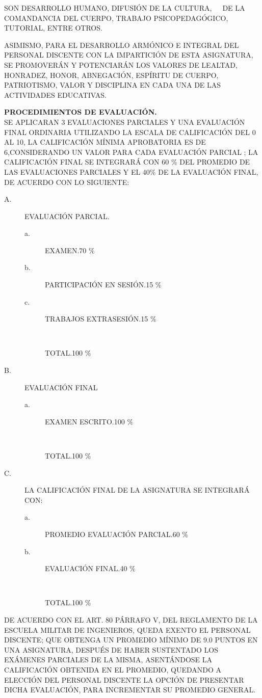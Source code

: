 \documentclass{myarticle}
\def\lineach#1#2{
#1\hfill #2
}
\begin{document}
\begin{description}
\begin{description}
SON DESARROLLO HUMANO, DIFUSIÓN DE LA CULTURA,\ \ \ DE LA COMANDANCIA DEL CUER\-PO, 
TRABAJO PSICOPEDAGÓGICO, TUTORIAL, ENTRE OTROS.
\item[D.]ASIMISMO, PARA EL DESARROLLO ARMÓNICO E INTEGRAL DEL PERSONAL 
DISCENTE CON LA IMPARTICIÓN DE ESTA ASIGNATURA, SE PROMOVERÁN Y POTENCIARÁN 
LOS VALORES DE LEALTAD, HONRADEZ, HONOR, ABNEGACIÓN, ES\-PÍ\-RI\-TU DE CUERPO, 
PATRIOTISMO, VALOR Y DISCIPLINA EN CADA UNA DE LAS ACTIVIDADES EDUCATIVAS.
\end{description}
\item[{\large{\bf IV.}}] {\large{\bf PROCEDIMIENTOS DE EVALUACIÓN.}}\\
SE APLICARAN 3 EVALUACIONES PARCIALES Y UNA E\-VA\-LUA\-CIÓN FINAL ORDINARIA 
UTILIZANDO LA ESCALA DE CALIFICACIÓN DEL 0 AL 10, LA CALIFICACIÓN MÍNIMA 
APROBATORIA ES DE 6,CONSIDERANDO UN VALOR PARA CADA EVALUACIÓN PARCIAL ; 
LA CALIFICACIÓN FINAL SE INTEGRARÁ CON 60 $\%$ DEL PROMEDIO DE LAS 
EVALUACIONES PARCIALES Y EL 40$\%$ DE LA EVALUACIÓN FINAL, DE ACUERDO CON 
LO SIGUIENTE:
\begin{description}
\item[A.]EVALUACIÓN PARCIAL.
\begin{description}
\item[a.]\lineach{EXAMEN.}{70 $\%$}
\item[b.]\lineach{PARTICIPACIÓN EN SESIÓN.}{15 $\%$}
\item[c.]\lineach{TRABAJOS EXTRASESIÓN.}{15 $\%$}
\item[\ \ ]\lineach{TOTAL.}{100 $\%$}
\end{description}
\item[B.]EVALUACIÓN FINAL
\begin{description}
\item[a.]\lineach{EXAMEN ESCRITO.}{100 $\%$}
\item[\ \ ]\lineach{TOTAL.}{100 $\%$}
\end{description}
\item[C.]LA CALIFICACIÓN FINAL DE LA ASIGNATURA SE INTEGRARÁ CON:
\begin{description}
\item[a.]\lineach{PROMEDIO EVALUACIÓN PARCIAL.}{60 $\%$}
\item[b.]\lineach{EVALUACIÓN FINAL.}{40 $\%$}
\item[\ \ ]\lineach{TOTAL.}{100 $\%$}
\end{description}
\end{description}
DE ACUERDO CON EL ART. 80 PÁRRAFO V, DEL REGLAMENTO DE LA ESCUELA MILITAR 
DE INGENIEROS, QUEDA EXENTO EL PERSONAL DISCENTE; QUE OBTENGA UN PROMEDIO 
MÍNIMO DE 9.0 PUNTOS EN UNA ASIGNATURA, DESPUÉS DE HABER SUSTENTADO LOS 
EXÁMENES PARCIALES DE LA MISMA, A\-SEN\-TÁN\-DO\-SE LA CALIFICACIÓN 
OBTENIDA EN EL PROMEDIO, QUE\-DAN\-DO A ELECCIÓN DEL PERSONAL DISCENTE LA 
OPCIÓN DE PRESENTAR DICHA EVALUACIÓN, PARA INCREMENTAR SU PRO\-ME\-DIO 
GENERAL.


\end{description}
\end{document}

